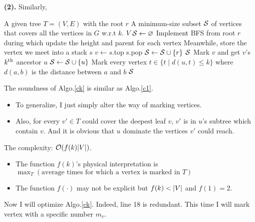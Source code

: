 \documentclass{article}
\begin{document}
\textbf{(2).} Similarly,
\begin{algorithm}[H]
	\caption{$\+M(T)$}
	\label{ck}
	\begin{algorithmic}[1]
		\renewcommand{\algorithmicrequire}{\textbf{Input:}}
		\renewcommand{\algorithmicensure}{\textbf{Output:}}
		\renewcommand{\algorithmiccomment}[1]{\hfill\textit{\textcolor{blue}{\##1}}}
		\REQUIRE A given tree $T=(V,E)$ with the root $r$
		\ENSURE A minimum-size subset $\+S$ of vertices that covers all the vertices in $G$ w.r.t $k$.
		\RETURN $V$
		\ENDIF
		\STATE $\+S\gets \emptyset$
		\STATE Implement BFS from root $r$ during which update the height and parent for each vertex
		\STATE Meanwhile, store the vertex we meet into a stack $s$
		\STATE $v\gets s$.top
		\STATE s.pop
		\STATE  $\+S\gets\+S\cup\{r\}$
		\RETURN $\+S$
		\ELSE
		\STATE Mark $v$ and get $v$'s $k^{\rm{th}}$ ancestor $u$
		\STATE $\+S\gets\+S\cup\{u\}$
		\STATE Mark every vertex $t\in\{t\mid d(u,t)\le k\}$ where $d(a,b)$ is the distance between $a$ and  $b$
		\ENDIF
		\ENDIF
		\ENDWHILE
		\RETURN $\+S$
	\end{algorithmic} 
\end{algorithm}
The soundness of Algo.\ref{ck} is similar as Algo.\ref{c1}.
\begin{itemize}
	\item To generalize, I just simply alter the way of marking vertices.
	\item Also, for every $v'\in T$ could cover the deepest leaf $v$, $v'$ is in $u$'s subtree which contain $v$. And it is obvious that  $u$ dominate  the vertices $v'$ could reach.
\end{itemize}
The complexity: $\+O(f(k)\abs{V})$.
\begin{itemize}
	\item 
		The function $f(k)$'s physical interpretation is $\max_T(\text{average times for which a vertex is marked in $T$})$
	\item 
		The function $f(\cdot)$ may not be explicit but $f(k)<\abs{V}$ and $f(1)=2$.
\end{itemize}
\newpage
Now I will optimize Algo.\ref{ck}. Indeed, line 18 is redundant.
This time I will mark vertex with a specific number $m_v$.
\end{document}
